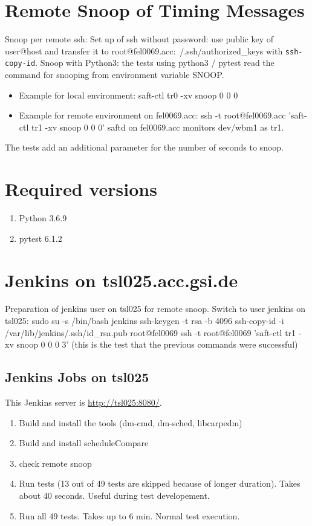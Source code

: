 \documentclass[12pt,a4paper]{report}
\begin{document}
\section{Remote Snoop of Timing Messages}
Snoop per remote ssh: Set up of ssh without password: use public key of user@host and transfer it to root@fel0069.acc:~/.ssh/authorized\_keys with \texttt{ssh-copy-id}.
Snoop with Python3: the tests using python3 / pytest read the command for snooping from environment variable SNOOP.
\begin{itemize}
\item Example for local environment: saft-ctl tr0 -xv snoop 0 0 0
\item Example for remote environment on fel0069.acc: ssh -t root@fel0069.acc 'saft-ctl tr1 -xv snoop 0 0 0' \linebreak
saftd on fel0069.acc monitors dev/wbm1 as tr1.
\end{itemize}
The tests add an additional parameter for the number of seconds to snoop.

\section{Required versions}
\begin{enumerate}
\item Python 3.6.9
\item pytest 6.1.2
\end{enumerate}

\section{Jenkins on tsl025.acc.gsi.de}
Preparation of jenkins user on tsl025 for remote snoop.
\linebreak Switch to user jenkins on tsl025:
\linebreak sudo su -s /bin/bash jenkins
\linebreak ssh-keygen -t rsa -b 4096
\linebreak ssh-copy-id -i /var/lib/jenkins/.ssh/id\_rsa.pub root@fel0069
\linebreak ssh -t root@fel0069 'saft-ctl tr1 -xv snoop 0 0 0 3' (this is the test that the previous commands were successful)

\subsection{Jenkins Jobs on tsl025}
This Jenkins server is \url{http://tsl025:8080/}.
\begin{enumerate}
\item Build and install the tools (dm-cmd, dm-sched, libcarpedm)
\item Build and install scheduleCompare
\item check remote snoop
\item Run tests (13 out of 49 tests are skipped because of longer duration). Takes about 40 seconds. Useful during test developement.
\item Run all 49 tests. Takes up to 6 min. Normal test execution.
\end{enumerate}
\end{document}
